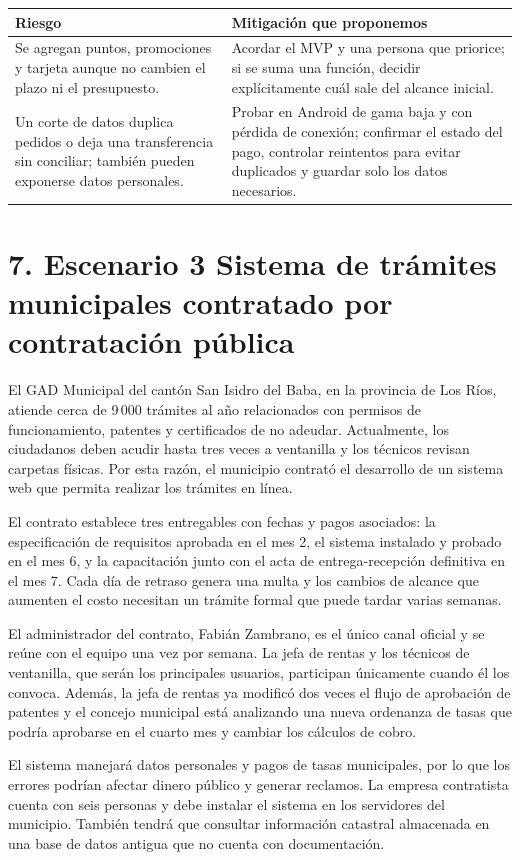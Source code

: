 \documentclass[10pt,letterpaper]{article}
\newcommand{\separa}{\hspace{0.25em}\raisebox{0.25ex}{\rule{0.38ex}{0.38ex}}\hspace{0.25em}}
\newcommand{\titulo}[1]{\section*{\textcolor{verde}{#1}}}
\begin{document}
\par
\begin{tabularx}{\linewidth}{@{}p{6cm}Y@{}}
\color{white}\textbf{Riesgo}&\color{white}\textbf{Mitigación que proponemos}\\\midrule
Se agregan puntos, promociones y tarjeta aunque no cambien el plazo ni el presupuesto.&Acordar el MVP y una persona que priorice; si se suma una función, decidir explícitamente cuál sale del alcance inicial.\\
Un corte de datos duplica pedidos o deja una transferencia sin conciliar; también pueden exponerse datos personales.&Probar en Android de gama baja y con pérdida de conexión; confirmar el estado del pago, controlar reintentos para evitar duplicados y guardar solo los datos necesarios.\\
\end{tabularx}
\par
\titulo{7. Escenario 3 \separa Sistema de trámites municipales contratado por contratación pública}
\par
El GAD Municipal del cantón San Isidro del Baba, en la provincia de Los Ríos, atiende cerca de 9\,000 trámites al año relacionados con permisos de funcionamiento, patentes y certificados de no adeudar. Actualmente, los ciudadanos deben acudir hasta tres veces a ventanilla y los técnicos revisan carpetas físicas. Por esta razón, el municipio contrató el desarrollo de un sistema web que permita realizar los trámites en línea.
\par
El contrato establece tres entregables con fechas y pagos asociados: la especificación de requisitos aprobada en el mes 2, el sistema instalado y probado en el mes 6, y la capacitación junto con el acta de entrega-recepción definitiva en el mes 7. Cada día de retraso genera una multa y los cambios de alcance que aumenten el costo necesitan un trámite formal que puede tardar varias semanas.
\par
El administrador del contrato, Fabián Zambrano, es el único canal oficial y se reúne con el equipo una vez por semana. La jefa de rentas y los técnicos de ventanilla, que serán los principales usuarios, participan únicamente cuando él los convoca. Además, la jefa de rentas ya modificó dos veces el flujo de aprobación de patentes y el concejo municipal está analizando una nueva ordenanza de tasas que podría aprobarse en el cuarto mes y cambiar los cálculos de cobro.
\par
El sistema manejará datos personales y pagos de tasas municipales, por lo que los errores podrían afectar dinero público y generar reclamos. La empresa contratista cuenta con seis personas y debe instalar el sistema en los servidores del municipio. También tendrá que consultar información catastral almacenada en una base de datos antigua que no cuenta con documentación.
\end{document}
